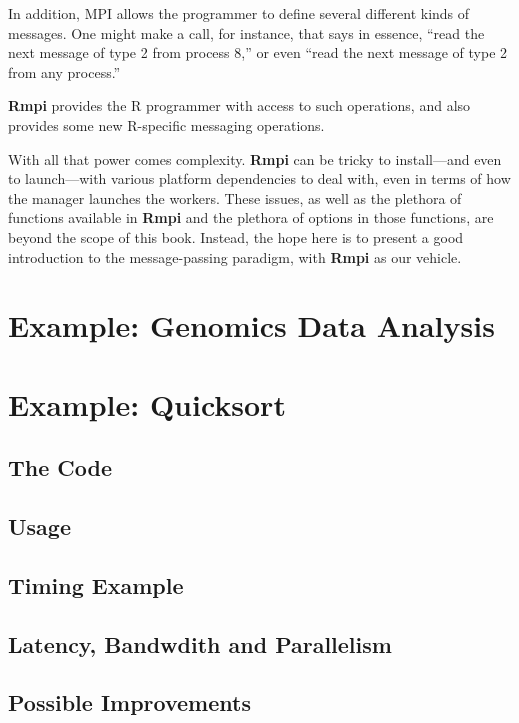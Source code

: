 In addition, MPI allows the programmer to define several different
kinds of messages.  One might make a call, for instance, that says in
essence, ``read the next message of type 2 from process 8,'' or even 
``read the next message of type 2 from any process.'' 

{\bf Rmpi} provides the R programmer with access to such operations, and
also provides some new R-specific messaging operations.

With all that power comes complexity.  {\bf Rmpi} can be tricky to
install---and even to launch---with various platform dependencies to
deal with, even in terms of how the manager launches the workers.  These
issues, as well as the plethora of functions available in {\bf Rmpi} and
the plethora of options in those functions, are beyond the scope of this
book.  Instead, the hope here is to present a good introduction to the
message-passing paradigm, with {\bf Rmpi} as our vehicle.

\section{Example:  Genomics Data Analysis}

\section{Example:  Quicksort}

\subsection{The Code}

\subsection{Usage}

\subsection{Timing Example}

\subsection{Latency, Bandwdith and Parallelism}
\label{latbandpar}

\subsection{Possible Improvements}

